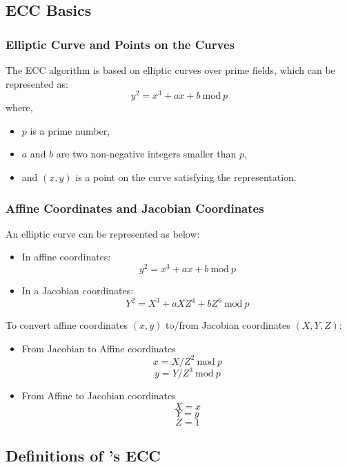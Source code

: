 \documentclass[main\_\_EN.tex]{subfiles}
\begin{document}
\subsection{ECC Basics}

\subsubsection{Elliptic Curve and Points on the Curves}
The ECC algorithm is based on elliptic curves over prime fields, which can be represented as:
\[
{y}^{2} = {x}^{3} + {ax} + b \ \textrm{mod}\ p
\]
where,
\begin{itemize}
    \item $p$ is a prime number,
    \item $a$ and $b$ are two non-negative integers smaller than $p$,
    \item and $(x, y)$ is a point on the curve satisfying the representation.
\end{itemize}

\subsubsection{Affine Coordinates and Jacobian Coordinates}

An elliptic curve can be represented as below:

\begin{itemize}
    \item In affine coordinates:
    \[
    {y}^{2} = {x}^{3} + {ax} + b \ \textrm{mod}\ p
    \]
    \item In a Jacobian coordinates:
    \[
    {Y}^{2} = {X}^{3} + {aXZ}^{4} + {bZ}^{6} \ \textrm{mod}\ p
    \]
\end{itemize}

To convert affine coordinates $(x,y)$ to/from Jacobian coordinates $(X,Y,Z)$:

\begin{itemize}
    \item From Jacobian to Affine coordinates
    \[
    x = X / {Z}^2 \ \textrm{mod}\ p
    \]
    \[
    y = Y / {Z}^3 \ \textrm{mod}\ p
    \]
    \item From Affine to Jacobian coordinates
    \[ X = x \]
    \[ Y = y \]
    \[ Z = 1\]
\end{itemize}

\subsection{Definitions of \chipname{}'s ECC}
\end{document}
